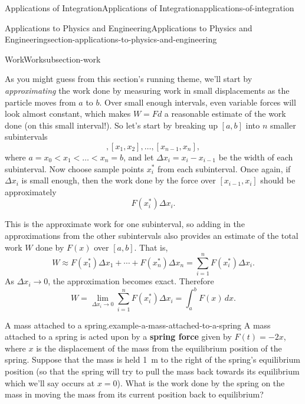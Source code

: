 \documentclass[oneside,10pt,]{book}
\newcommand{\terminology}[1]{\textbf{#1}}
\numberwithin{equation}{section}
\newcommand{\lt}{<}
\begin{document}
\begin{chapterptx}{Applications of Integration}{}{Applications of Integration}{}{}{applications-of-integration}
\begin{sectionptx}{Applications to Physics and Engineering}{}{Applications to Physics and Engineering}{}{}{section-applications-to-physics-and-engineering}
\begin{subsectionptx}{Work}{}{Work}{}{}{subsection-work}
\par
\hypertarget{p-683}{}%
As you might guess from this section's running theme, we'll start by \emph{approximating} the work done by measuring work in small displacements as the particle moves from \(a\) to \(b\). Over small enough intervals, even variable forces will look almost constant, which makes \(W = Fd\) a reasonable estimate of the work done (on this small interval!). So let's start by breaking up \([a,b]\) into \(n\) smaller subintervals%
\begin{equation*}
[x_{0}, x_{1}], [x_{1}, x_{2}], \ldots, [x_{n-1}, x_{n}],
\end{equation*}
where \(a = x_{0} \lt x_{1} \lt \ldots \lt x_{n} = b\), and let \(\Delta x_{i} = x_{i} - x_{i-1}\) be the width of each subinterval. Now choose sample points \(x_{i}^{*}\) from each subinterval. Once again, if \(\Delta x_{i}\) is small enough, then the work done by the force over \([x_{i-1}, x_{i}]\) should be approximately%
\begin{equation*}
F(x_{i}^{*})\Delta x_{i}.
\end{equation*}
%
\par
\hypertarget{p-684}{}%
This is the approximate work for one subinterval, so adding in the approximations from the other subintervals also provides an estimate of the total work \(W\) done by \(F(x)\) over \([a,b]\). That is,%
\begin{equation*}
W \approx F(x_{1}^{*})\Delta x_{1} + \cdots + F(x_{n}^{*})\Delta x_{n} = \sum_{i=1}^{n}F(x_{i}^{*})\Delta x_{i}.
\end{equation*}
As \(\Delta x_{i}\to 0\), the approximation becomes exact. Therefore%
\begin{equation}
W = \lim_{\Delta x_{i}\to 0}\sum_{i=1}^{n}F(x_{i}^{*})\Delta x_{i} = \int_{a}^{b}F(x)\,dx.\label{equation-work-integral}
\end{equation}
%
\begin{example}{A mass attached to a spring.}{example-a-mass-attached-to-a-spring}%
\hypertarget{p-685}{}%
A mass attached to a spring is acted upon by a \terminology{spring force} given by \(F(t) = -2x\), where \(x\) is the displacement of the mass from the equilibrium position of the spring. Suppose that the mass is held \SI{1}{\meter} to the right of the spring's equilibrium position (so that the spring will try to pull the mass back towards its equilibrium which we'll say occurs at \(x = 0\)). What is the work done by the spring on the mass in moving the mass from its current position back to equilibrium?%
\par\smallskip%

\end{example}
\end{subsectionptx}
\end{sectionptx}
\end{chapterptx}
\end{document}
